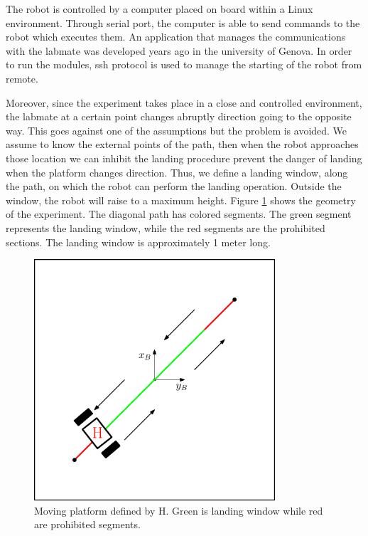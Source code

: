 The robot is controlled by a computer placed on board within a Linux environment. Through serial port, the computer is able to send commands to the robot which executes them. An application that manages the communications with the labmate was developed years ago in the university of Genova. In order to run the modules, ssh protocol is used to manage the starting of the robot from remote. 

Moreover, since the experiment takes place in a close and controlled environment, the labmate at a certain point changes abruptly direction going to the opposite way. This goes against one of the assumptions but the problem is avoided. We assume to know the external points of the path, then when the robot approaches those location we can inhibit the landing procedure prevent the danger of landing when the platform changes direction.  Thus, we define a landing window, along the path, on which the robot can perform the landing operation. Outside the window, the robot will raise to a maximum height. Figure \ref{figure:window} shows the geometry of the experiment. The diagonal path has colored segments. The green segment represents the landing window, while the red segments are the prohibited sections. The landing window is approximately 1 meter long. 
\begin{figure}[h]
 \centering
   \includegraphics[width = 0.8\textwidth ]{landwindow3.eps}
    \caption[Experiment geometry]{Moving platform defined by H. Green is landing window while red are prohibited segments.}
   \label{figure:window}
\end{figure}


